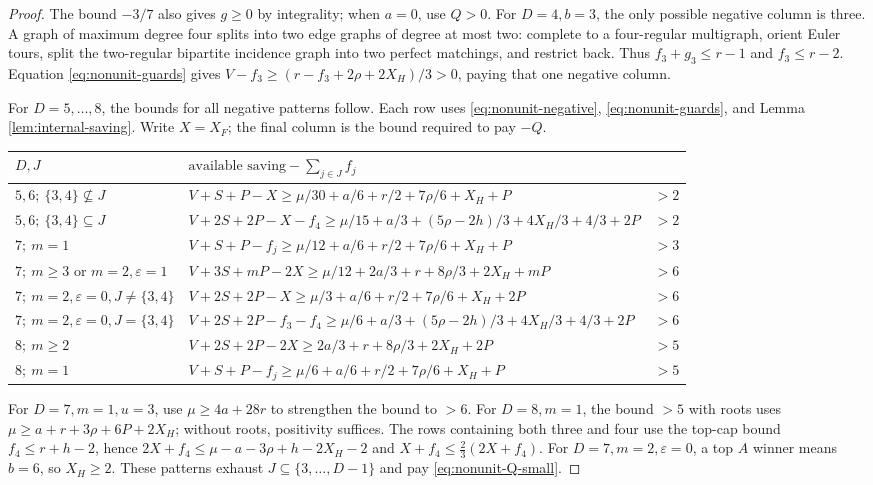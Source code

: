 \documentclass[11pt,a4paper]{article}
\theoremstyle{definition}
\begin{document}
\begin{proof}
The bound $-3/7$ also gives $g\ge0$ by integrality; when $a=0$, use $Q>0$.
For $D=4,b=3$, the only possible negative column is three.
A graph of maximum degree four splits into two edge graphs of degree at most two:
complete to a four-regular multigraph, orient Euler tours, split the two-regular bipartite incidence graph into two perfect matchings, and restrict back.
Thus $f_3+g_3\le r-1$ and $f_3\le r-2$.
Equation \eqref{eq:nonunit-guards} gives
$V-f_3\ge(r-f_3+2\rho+2X_H)/3>0$, paying that one negative column.

For $D=5,\ldots,8$, the bounds for all negative patterns follow.
Each row uses \eqref{eq:nonunit-negative}, \eqref{eq:nonunit-guards}, and Lemma \ref{lem:internal-saving}.
Write $X=X_F$; the final column is the bound required to pay $-Q$.

\begin{center}\small
\begin{longtable}{P{.23\textwidth}P{.60\textwidth}c}
\toprule
$D,J$& $\text{available saving}-\sum_{j\in J}f_j$&\\\midrule
$5,6;\ \{3,4\}\nsubseteq J$&
$V+S+P-X\ge\mu/30+a/6+r/2+7\rho/6+X_H+P$&$>2$\\
$5,6;\ \{3,4\}\subseteq J$&
$V+2S+2P-X-f_4\ge\mu/15+a/3+(5\rho-2h)/3+4X_H/3+4/3+2P$&$>2$\\
$7;\ m=1$&
$V+S+P-f_j\ge\mu/12+a/6+r/2+7\rho/6+X_H+P$&$>3$\\
$7;\ m\ge3\text{ or }m=2,\varepsilon=1$&
$V+3S+mP-2X\ge\mu/12+2a/3+r+8\rho/3+2X_H+mP$&$>6$\\
$7;\ m=2,\varepsilon=0,J\ne\{3,4\}$&
$V+2S+2P-X\ge\mu/3+a/6+r/2+7\rho/6+X_H+2P$&$>6$\\
$7;\ m=2,\varepsilon=0,J=\{3,4\}$&
$V+2S+2P-f_3-f_4\ge\mu/6+a/3+(5\rho-2h)/3+4X_H/3+4/3+2P$&$>6$\\
$8;\ m\ge2$&
$V+2S+2P-2X\ge2a/3+r+8\rho/3+2X_H+2P$&$>5$\\
$8;\ m=1$&
$V+S+P-f_j\ge\mu/6+a/6+r/2+7\rho/6+X_H+P$&$>5$\\
\bottomrule
\end{longtable}\end{center}

For $D=7,m=1,u=3$, use $\mu\ge4a+28r$ to strengthen the bound to $>6$.
For $D=8,m=1$, the bound $>5$ with roots uses
$\mu\ge a+r+3\rho+6P+2X_H$; without roots, positivity suffices.
The rows containing both three and four use the top-cap bound $f_4\le r+h-2$, hence
$2X+f_4\le\mu-a-3\rho+h-2X_H-2$ and
$X+f_4\le\frac23(2X+f_4)$.
For $D=7,m=2,\varepsilon=0$, a top $A$ winner means $b=6$, so $X_H\ge2$.
These patterns exhaust $J\subseteq\{3,\ldots,D-1\}$ and pay \eqref{eq:nonunit-Q-small}.


\end{proof}
\end{document}
